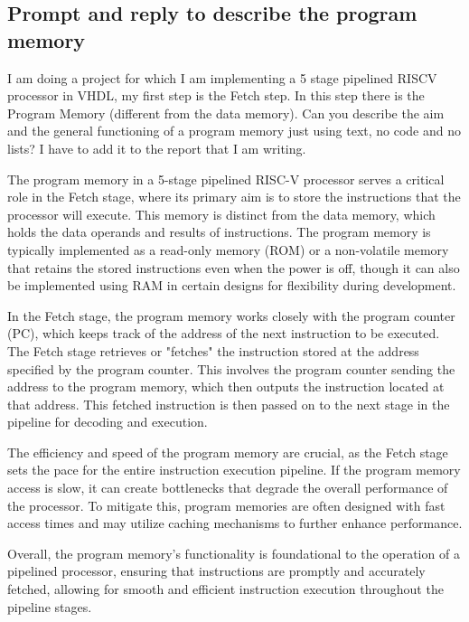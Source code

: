 \documentclass{article}
\begin{document}
\subsection{Prompt and reply to describe the program memory}\label{prompt:pmem}
\begin{itshape}
I am doing a project for which I am implementing a 5 stage pipelined RISCV processor in VHDL, my
first step is the Fetch step. In this step there is the Program Memory (different from the data memory). Can you describe the aim and
the general functioning of a program memory just using text, no code and no lists? I have to add it to
the report that I am writing.
\end{itshape}

\begin{spverbatim}
The program memory in a 5-stage pipelined RISC-V processor serves a critical role in the Fetch stage, where its primary aim is to store the instructions that the processor will execute. This memory is distinct from the data memory, which holds the data operands and results of instructions. The program memory is typically implemented as a read-only memory (ROM) or a non-volatile memory that retains the stored instructions even when the power is off, though it can also be implemented using RAM in certain designs for flexibility during development.

In the Fetch stage, the program memory works closely with the program counter (PC), which keeps track of the address of the next instruction to be executed. The Fetch stage retrieves or "fetches" the instruction stored at the address specified by the program counter. This involves the program counter sending the address to the program memory, which then outputs the instruction located at that address. This fetched instruction is then passed on to the next stage in the pipeline for decoding and execution.

The efficiency and speed of the program memory are crucial, as the Fetch stage sets the pace for the entire instruction execution pipeline. If the program memory access is slow, it can create bottlenecks that degrade the overall performance of the processor. To mitigate this, program memories are often designed with fast access times and may utilize caching mechanisms to further enhance performance.

Overall, the program memory's functionality is foundational to the operation of a pipelined processor, ensuring that instructions are promptly and accurately fetched, allowing for smooth and efficient instruction execution throughout the pipeline stages.
\end{spverbatim}
\end{document}
